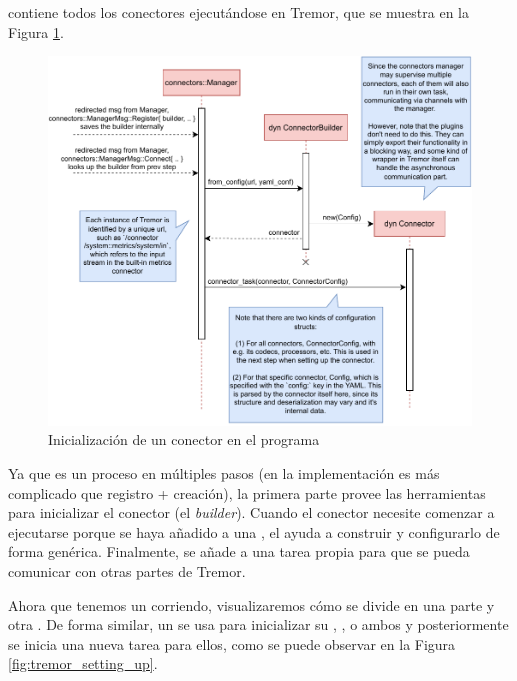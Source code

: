  contiene todos los conectores ejecutándose en Tremor,
que se muestra en la Figura \ref{fig:tremor_initializing}.

\begin{figure}
    \centering
    \includegraphics[width=\textwidth]{./Imagenes/initializing.pdf}
    \caption{Inicialización de un conector en el programa}%
    \label{fig:tremor_initializing}
\end{figure}

Ya que es un proceso en múltiples pasos (en la implementación es más complicado
que registro + creación), la primera parte provee las herramientas para
inicializar el conector (el \emph{builder}). Cuando el conector necesite
comenzar a ejecutarse porque se haya añadido a una \pipeline, el \builder ayuda
a construir y configurarlo de forma genérica. Finalmente, se añade a una tarea
propia para que se pueda comunicar con otras partes de Tremor.

Ahora que tenemos un \connector corriendo, visualizaremos cómo se divide en una
parte \sink y otra \source. De forma similar, un \builder se usa para
inicializar su \sink, \source, o ambos y posteriormente se inicia una nueva
tarea para ellos, como se puede observar en la Figura
\ref{fig:tremor_setting_up}.

